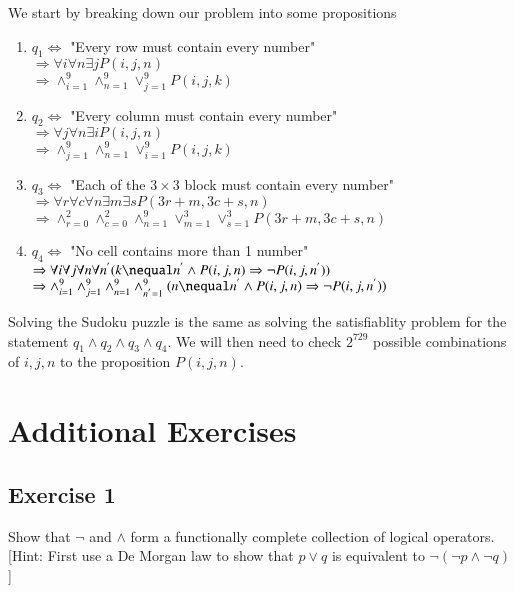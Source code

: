 \documentclass{article}
\begin{document}
\noindent We start by breaking down our problem into some propositions
\begin{enumerate}
	\item $q_{1} \Leftrightarrow$ "Every row must contain every number" \\ $\Rightarrow \forall i \forall n \exists j P(i,j,n)$ \\
	      $\Rightarrow \wedge_{i=1}^{9} \wedge_{n=1}^{9} \vee_{j=1}^{9} P(i,j,k)$
	\item $q_{2} \Leftrightarrow$ "Every column must contain every number" \\ $\Rightarrow \forall j \forall n \exists i P(i,j,n)$ \\
	      $\Rightarrow \wedge_{j=1}^{9} \wedge_{n=1}^{9} \vee_{i=1}^{9} P(i,j,k)$
	\item $q_{3} \Leftrightarrow$ "Each of the $3 \times 3$ block must contain every number" \\
	      $\Rightarrow \forall r \forall c \forall n \exists m \exists s P(3r+m, 3c+s, n)$ \\
	      $\Rightarrow \wedge_{r=0}^{2} \wedge_{c=0}^{2} \wedge_{n=1}^{9} \vee_{m=1}^{3} \vee_{s=1}^{3}P(3r+m, 3c+s, n)$
	\item $q_{4} \Leftrightarrow$ "No cell contains more than 1 number" \\
	      $\Rightarrow \forall i \forall j \forall n \forall n^{'}(k \nequal n^{'} \wedge P(i,j,n) \Rightarrow \neg P(i,j,n^{'}))$ \\
	      $\Rightarrow \wedge_{i=1}^9 \wedge_{j=1}^9 \wedge_{n=1}^9 \wedge_{n^{'}=1}^9 (n \nequal n^{'} \wedge P(i,j,n) \Rightarrow \neg P(i,j,n^{'}))$
\end{enumerate}

\noindent Solving the Sudoku puzzle is the same as solving the satisfiablity problem for the statement $q_{1} \wedge q_{2} \wedge q_{3} \wedge q_{4}$.
We will then need to check $2^{729}$ possible combinations of $i, j, n$ to the proposition $P(i,j,n)$.

\section{Additional Exercises}
\subsection*{Exercise 1}
Show that $\neg$ and $\wedge$ form a functionally complete collection of logical operators. [Hint: First use a De Morgan law
		to show that $p \vee q$ is equivalent to $\neg (\neg p \wedge \neg q)$]
\end{document}
